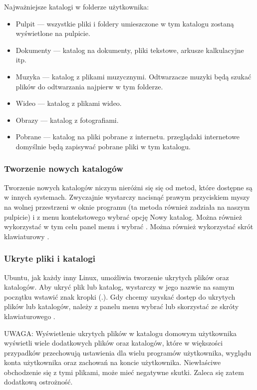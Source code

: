 Najważniejsze katalogi w folderze użytkownika:
\begin{itemize}
\item \textcolor{ubuntu_orange}{Pulpit} --- wszystkie pliki i foldery umieszczone w tym katalogu zostaną wyświetlone na pulpicie.
\item \textcolor{ubuntu_orange}{Dokumenty} --- katalog na dokumenty, pliki tekstowe, arkusze kalkulacyjne itp.
\item \textcolor{ubuntu_orange}{Muzyka} --- katalog z plikami muzycznymi. Odtwarzacze muzyki będą szukać plików do odtwarzania najpierw w tym folderze.
\item \textcolor{ubuntu_orange}{Wideo} --- katalog z plikami wideo.
\item \textcolor{ubuntu_orange}{Obrazy} --- katalog z fotografiami.
\item \textcolor{ubuntu_orange}{Pobrane} --- katalog na pliki pobrane z internetu. przeglądaki internetowe domyślnie będą zapisywać pobrane pliki w tym katalogu.
\end{itemize}

\subsubsection{Tworzenie nowych katalogów}
Tworzenie nowych katalogów niczym nieróżni się się od metod, które dostępne są w innych systemach. Zwyczajnie wystarczy nacisnąć prawym przyciskiem myszy na wolnej przestrzeni w oknie programu (ta metoda również zadziała na naszym pulpicie) i z menu kontekstowego wybrać opcję \textcolor{ubuntu_orange}{Nowy katalog}. Można również wykorzystać w tym celu panel menu i wybrać . Można również wykorzystać skrót klawiaturowy .

\subsubsection{Ukryte pliki i katalogi}
Ubuntu, jak każdy inny Linux, umożliwia tworzenie ukrytych plików oraz katalogów. Aby ukryć plik lub katalog, wystarczy w jego nazwie na samym początku wstawić znak kropki (.). Gdy chcemy uzyskać dostęp do ukrytych plików lub katalogów, należy z panelu menu wybrać  lub skorzystać ze skróty klawiaturowego .

UWAGA: Wyświetlenie ukrytych plików w katalogu domowym użytkownika wyświetli wiele dodatkowych plików oraz katalogów, które w większości przypadków przechowują ustawienia dla wielu programów użytkownika, wyglądu konta użytkownika oraz zachowań na koncie użytkownika. Niewłaściwe obchodzenie się z tymi plikami, może mieć negatywne skutki. Zaleca się zatem dodatkową ostrożność.

